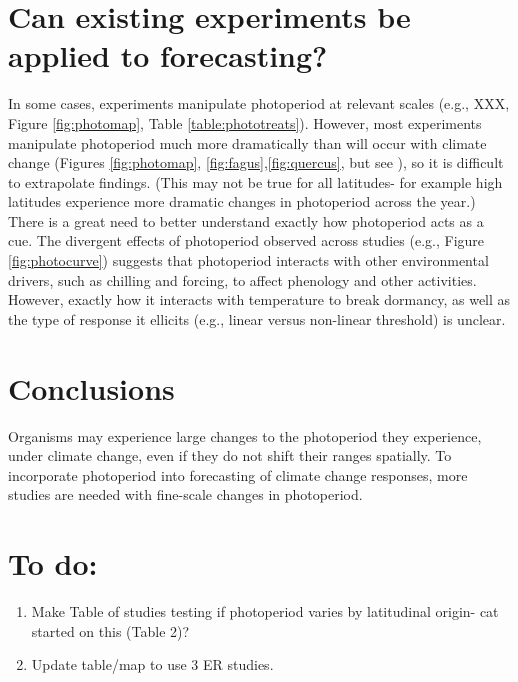 \documentclass{article}
\begin{document}
\section*{Can existing experiments be applied to forecasting?}
In some cases, experiments manipulate photoperiod at relevant scales (e.g., XXX, Figure \ref{fig:photomap}, Table \ref{table:phototreats}). However, most experiments manipulate photoperiod much more dramatically than will occur with climate change (Figures \ref{fig:photomap}, \ref{fig:fagus},\ref{fig:quercus}, but see \citep{Basler:2012}), so it is difficult to extrapolate findings. (This may not be true for all latitudes- for example high latitudes experience more dramatic changes in photoperiod across the year.)
There is a great need to better understand exactly how photoperiod acts as a cue. The divergent effects of photoperiod observed across studies (e.g., Figure \ref{fig:photocurve}) suggests that photoperiod interacts with other environmental drivers, such as chilling and forcing, to affect phenology and other activities. However, exactly how it interacts with temperature to break dormancy, as well as the type of response it ellicits (e.g., linear versus non-linear threshold) is unclear. 
\section*{Conclusions}
Organisms may experience large changes to the photoperiod they experience, under climate change, even if they do not shift their ranges spatially. To incorporate photoperiod into forecasting of climate change responses, more studies are needed with fine-scale changes in photoperiod. 


\section* {To do:}
\begin{enumerate}
\item Make Table of studies testing if photoperiod varies by latitudinal origin- cat started on this (Table 2)?
\item Update table/map to use 3 ER studies.
\end{enumerate}
\end{document}
